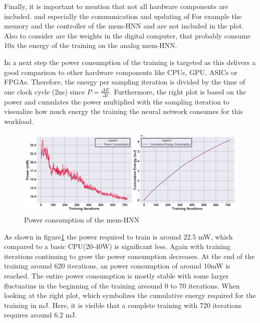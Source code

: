 Finally, it is important to mention that not all hardware components are included. and especially the communication and updating of 
For example the memory and the controller of the \ac{mem-HNN} and are not included in the plot.
Also to consider are the weights in the digital computer, that probably consume 10x the energy of the training on the analog \ac{mem-HNN}. 

In a next step the power consumption of the training is targeted as this delivers a good comparison to other
hardware components like \ac{CPU}s, \ac{GPU}, \ac{ASIC}s or \ac{FPGA}s.
Therefore, the energy per sampling iteration is divided by the time of one clock cycle (2ns) since \(P = \frac{\Delta E}{\Delta t}\).
Furthermore, the right plot is based on the power and cumulates the power multiplied with the sampling iteration to vissualize how much energy the training the neural network consumes for this workload.
\begin{figure}[H]
    \centering
    \includegraphics[width=1\linewidth]{graphics/energy_consumption_cumulative_plot.png}
    \caption{Power consumption of the \ac{mem-HNN}}
    \label{Power consumption}
\end{figure}
As shown in figure\ref{Power consumption} the power required to train is around 22.5 mW, which compared to a basic CPU(20-40W)
is significant less. 
Again with training iterations continuing to grow the power consumption decreases. 
At the end of the training around 620 iterations, an power consumption of around 10mW is reached. 
The entire power consumption is mostly stable with some larger fluctuatins in the beginning of the training areound 0 to 70 iterations.
When looking at the right plot, which symbolizes the cumulative energy required for the training in mJ.
Here, it is visible that a complete training with 720 iterations requires around 6.2 mJ. 
